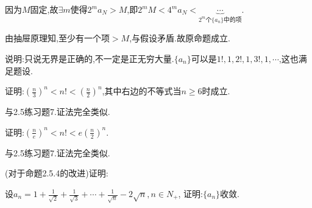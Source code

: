 \documentclass{exam}
\begin{document}
\begin{questions}
\begin{parts}
\begin{solution}
            因为$M$固定,故$\exists m$使得$2^ma_N>M$,即$2^mM<4^ma_N<\underbrace{\cdots}_{2^m\text{个}\{a_n\}\text{中的项}} $.

            由抽屉原理知,至少有一个项$>M$,与假设矛盾.故原命题成立.

            说明:只说无界是正确的,不一定是正无穷大量.$\{a_n\}$可以是$1!,1,2!,1,3!,1,\cdots$,这也满足题设.
        \end{solution}
    \end{parts}

    \question
    证明:$\left(\frac{n}{3}\right)^n<n!<\left(\frac{n}{2}\right)^n$,其中右边的不等式当$n\geqslant 6$时成立.
    \begin{solution}
        与2.5练习题7.证法完全类似.
    \end{solution}

    \question
    证明:$\left(\frac{n}{e}\right)^n<n!<e\left(\frac{n}{2}\right)^n$.
    \begin{solution}
        与2.5练习题7.证法完全类似.
    \end{solution}

    \question
    (对于命题2.5.4的改进)证明:

    \question
    设$a_n=1+\frac{1}{\sqrt{2}}+\frac{1}{\sqrt{3}}+\cdots+\frac{1}{\sqrt{n}}-2\sqrt{n},n\in N_+$,
    证明:$\{a_n\}$收敛.


\end{questions}
\end{document}
